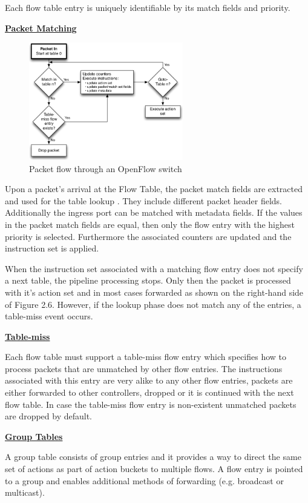 Each flow table entry is uniquely identifiable by its match fields and priority. 


\underline{\textbf{Packet Matching}}

\begin{figure}[H]
\centering
\includegraphics[width=0.6\textwidth]{images/fundamentals/openflow_packet_matching.png}
\caption{Packet flow through an OpenFlow switch}
\end{figure}

Upon a packet's arrival at the Flow Table, the packet match fields are extracted and used for the table lookup \cite{ofspecification}. They include different packet header fields. Additionally the ingress port can be matched with metadata fields.
If the values in the packet match fields are equal, then only the flow entry with the highest priority is selected. Furthermore the associated counters are updated and the instruction set is applied.

When the instruction set associated with a matching flow entry does not specify a next table, the pipeline processing stops. Only then the packet is processed with it's action set and in most cases forwarded as shown on the right-hand side of Figure 2.6.
However, if the lookup phase does not match any of the entries, a table-miss event occurs.


\underline{\textbf{Table-miss}}

Each flow table must support a table-miss flow entry which specifies how to process packets that are unmatched by other flow entries. The instructions associated with this entry are very alike to any other flow entries, packets are either forwarded to other controllers, dropped or it is continued with the next flow table. In case the table-miss flow entry is non-existent unmatched packets are dropped by default. 


\underline{\textbf{Group Tables}}

A group table consists of group entries and it provides a way to direct the same set of actions as part of action buckets to multiple flows. A flow entry is pointed to a group and enables additional methods of forwarding (e.g. broadcast or multicast).


